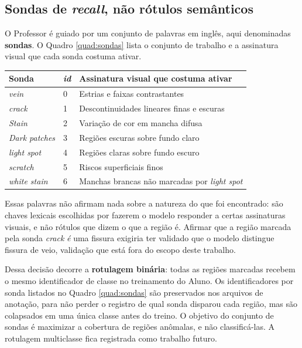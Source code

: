 \subsection{Sondas de \textit{recall}, não rótulos semânticos}
\label{sec:sondas}

O Professor é guiado por um conjunto de palavras em inglês, aqui denominadas \textbf{sondas}. O Quadro \ref{quad:sondas} lista o conjunto de trabalho e a assinatura visual que cada sonda costuma ativar.

\begin{quadro}[ht]
  \caption{Sondas textuais, identificadores e assinatura visual associada.}
  \label{quad:sondas}
  \centering
  \begin{tabularx}{\textwidth}{llX}
    \hline
    \bfseries Sonda & \bfseries \textit{id} & \bfseries Assinatura visual que costuma ativar \\
    \hline
    \textit{vein}         & 0 & Estrias e faixas contrastantes \\
    \textit{crack}        & 1 & Descontinuidades lineares finas e escuras \\
    \textit{Stain}        & 2 & Variação de cor em mancha difusa \\
    \textit{Dark patches} & 3 & Regiões escuras sobre fundo claro \\
    \textit{light spot}   & 4 & Regiões claras sobre fundo escuro \\
    \textit{scratch}      & 5 & Riscos superficiais finos \\
    \textit{white stain}  & 6 & Manchas brancas não marcadas por \textit{light spot} \\
    \hline
  \end{tabularx}
\end{quadro}

Essas palavras não afirmam nada sobre a natureza do que foi encontrado: são chaves lexicais escolhidas por fazerem o modelo responder a certas assinaturas visuais, e não rótulos que dizem o que a região é. Afirmar que a região marcada pela sonda \textit{crack} \textit{é} uma fissura exigiria ter validado que o modelo distingue fissura de veio, validação que está fora do escopo deste trabalho.

Dessa decisão decorre a \textbf{rotulagem binária}: todas as regiões marcadas recebem o mesmo identificador de classe no treinamento do Aluno. Os identificadores por sonda listados no Quadro \ref{quad:sondas} são preservados nos arquivos de anotação, para não perder o registro de qual sonda disparou cada região, mas são colapsados em uma única classe antes do treino. O objetivo do conjunto de sondas é maximizar a cobertura de regiões anômalas, e não classificá-las. A rotulagem multiclasse fica registrada como trabalho futuro.


